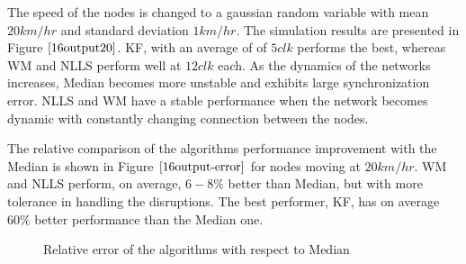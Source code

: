 \documentclass[journal]{IEEEtran}
\begin{document}
\par
The speed of the nodes is changed to a gaussian random variable with mean $20km/hr$ and standard deviation $1km/hr$. The simulation results are presented in Figure $\ref{16output20}$. KF, with an average of of $5 clk$ performs the best, whereas WM and NLLS perform well at $12 clk$ each. As the dynamics of the networks increases, Median becomes more unstable and exhibits large synchronization error. NLLS and WM have a stable performance when the network becomes dynamic with constantly changing connection between the nodes.
\par
The relative comparison of the algorithms performance improvement with the Median is shown in Figure $\ref{16output-error}$ for nodes moving at $20km/hr$. WM and NLLS perform, on average, $6-8\%$ better than Median, but with more tolerance in handling the disruptions. The best performer, KF, has on average $60\%$ better performance than the Median one.
\begin{figure}
\centerline{  \hfil {}} \caption{Relative error of the algorithms with respect to Median}
\label{error}
\end{figure}
\end{document}
